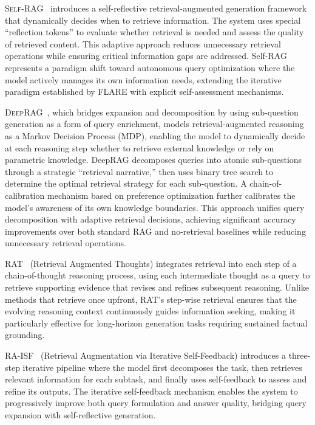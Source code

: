 \documentclass{article}
\begin{document}
\textsc{Self-RAG}~\citep{SelfRAG} introduces a self-reflective retrieval-augmented generation framework that dynamically decides when to retrieve information. The system uses special ``reflection tokens'' to evaluate whether retrieval is needed and assess the quality of retrieved content. This adaptive approach reduces unnecessary retrieval operations while ensuring critical information gaps are addressed. Self-RAG represents a paradigm shift toward autonomous query optimization where the model actively manages its own information needs, extending the iterative paradigm established by FLARE with explicit self-assessment mechanisms.

\textsc{DeepRAG}~\citep{DeepRAG}, which bridges expansion and decomposition by using sub-question generation as a form of query enrichment, models retrieval-augmented reasoning as a Markov Decision Process (MDP), enabling the model to dynamically decide at each reasoning step whether to retrieve external knowledge or rely on parametric knowledge. DeepRAG decomposes queries into atomic sub-questions through a strategic ``retrieval narrative,'' then uses binary tree search to determine the optimal retrieval strategy for each sub-question. A chain-of-calibration mechanism based on preference optimization further calibrates the model's awareness of its own knowledge boundaries. This approach unifies query decomposition with adaptive retrieval decisions, achieving significant accuracy improvements over both standard RAG and no-retrieval baselines while reducing unnecessary retrieval operations.

\textsc{RAT}~\citep{RAT} (Retrieval Augmented Thoughts) integrates retrieval into each step of a chain-of-thought reasoning process, using each intermediate thought as a query to retrieve supporting evidence that revises and refines subsequent reasoning. Unlike methods that retrieve once upfront, RAT's step-wise retrieval ensures that the evolving reasoning context continuously guides information seeking, making it particularly effective for long-horizon generation tasks requiring sustained factual grounding.

\textsc{RA-ISF}~\citep{RA-ISF} (Retrieval Augmentation via Iterative Self-Feedback) introduces a three-step iterative pipeline where the model first decomposes the task, then retrieves relevant information for each subtask, and finally uses self-feedback to assess and refine its outputs. The iterative self-feedback mechanism enables the system to progressively improve both query formulation and answer quality, bridging query expansion with self-reflective generation.
\end{document}

